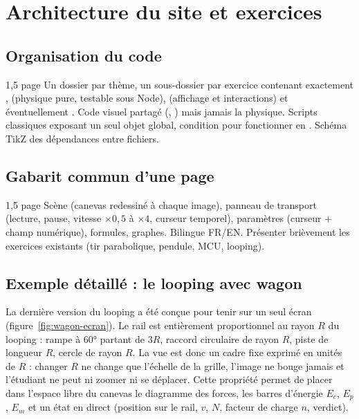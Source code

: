 
\chapter{Architecture du site et exercices}
\label{chap:architecture}

\section{Organisation du code}

\begin{arediger}{1,5 page}
Un dossier par thème, un sous-dossier par exercice contenant exactement
,  (physique pure, testable sous Node),
 (affichage et interactions) et éventuellement
. Code visuel partagé (,
) mais jamais la physique. Scripts classiques exposant
un seul objet global, condition pour fonctionner en .
Schéma TikZ des dépendances entre fichiers.
\end{arediger}

\section{Gabarit commun d'une page}

\begin{arediger}{1,5 page}
Scène (canevas redessiné à chaque image), panneau de transport (lecture,
pause, vitesse \(\times 0{,}5\) à \(\times 4\), curseur temporel), paramètres
(curseur + champ numérique), formules, graphes. Bilingue FR/EN. Présenter
brièvement les exercices existants (tir parabolique, pendule, MCU, looping).
\end{arediger}

\section{Exemple détaillé : le looping avec wagon}
\label{sec:exercice-wagon}

La dernière version du looping a été conçue pour tenir sur un seul écran
(figure~\ref{fig:wagon-ecran}). Le rail est entièrement proportionnel au rayon
\(R\) du looping : rampe à \ang{60} partant de \(3R\), raccord circulaire de rayon
\(R\), piste de longueur \(R\), cercle de rayon \(R\). La vue est donc un cadre
fixe exprimé en unités de \(R\) : changer \(R\) ne change que l'échelle de la
grille, l'image ne bouge jamais et l'étudiant ne peut ni zoomer ni se déplacer.
Cette propriété permet de placer dans l'espace libre du canevas le diagramme des
forces, les barres d'énergie \(E_c\), \(E_p\), \(E_m\) et un état en direct
(position sur le rail, \(v\), \(N\), facteur de charge \(n\), verdict).

